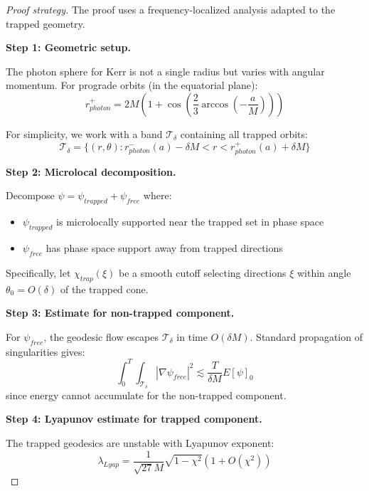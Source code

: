 \documentclass[12pt,a4paper]{article}
\begin{document}
\begin{proof}[Proof strategy]
The proof uses a frequency-localized analysis adapted to the trapped geometry.

\textbf{Step 1: Geometric setup.}

The photon sphere for Kerr is not a single radius but varies with angular momentum. For prograde orbits (in the equatorial plane):
\begin{equation}
r_{photon}^+ = 2M\left(1 + \cos\left(\frac{2}{3}\arccos\left(-\frac{a}{M}\right)\right)\right)
\end{equation}

For simplicity, we work with a band $\mathcal{T}_\delta$ containing all trapped orbits:
\begin{equation}
\mathcal{T}_\delta = \{(r, \theta): r_{photon}^-(a) - \delta M < r < r_{photon}^+(a) + \delta M\}
\end{equation}

\textbf{Step 2: Microlocal decomposition.}

Decompose $\psi = \psi_{trapped} + \psi_{free}$ where:
\begin{itemize}
    \item $\psi_{trapped}$ is microlocally supported near the trapped set in phase space
    \item $\psi_{free}$ has phase space support away from trapped directions
\end{itemize}

Specifically, let $\chi_{trap}(\xi)$ be a smooth cutoff selecting directions $\xi$ within angle $\theta_0 = O(\delta)$ of the trapped cone.

\textbf{Step 3: Estimate for non-trapped component.}

For $\psi_{free}$, the geodesic flow escapes $\mathcal{T}_\delta$ in time $O(\delta M)$. Standard propagation of singularities gives:
\begin{equation}
\int_0^T \int_{\mathcal{T}_\delta} |\nabla\psi_{free}|^2 \lesssim \frac{T}{\delta M} E[\psi]_0
\end{equation}
since energy cannot accumulate for the non-trapped component.

\textbf{Step 4: Lyapunov estimate for trapped component.}

The trapped geodesics are unstable with Lyapunov exponent:
\begin{equation}
\lambda_{Lyap} = \frac{1}{\sqrt{27}M}\sqrt{1 - \chi^2}\left(1 + O(\chi^2)\right)
\end{equation}


\end{proof}
\end{document}
